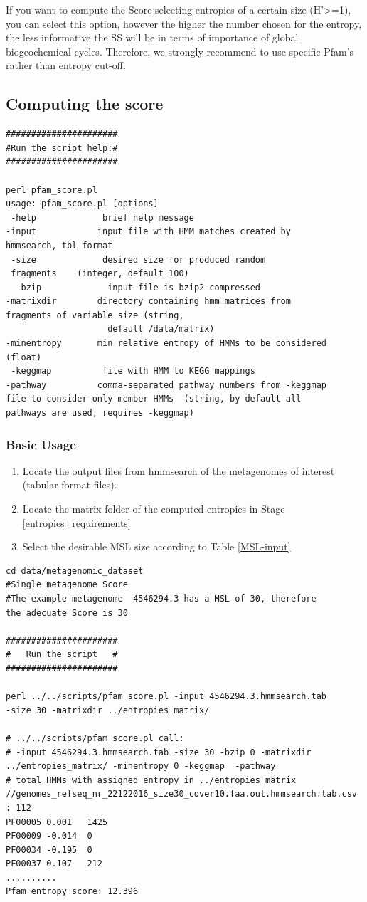 \documentclass[12pt]{report}
\begin{document}
If you want to compute the Score selecting entropies of a certain 
size (H'>=1), you can select this 
option, however  the higher the number chosen for the entropy,  
the less informative the SS will be in terms of importance of 
global biogeochemical cycles. Therefore, we strongly recommend to 
use specific Pfam's rather than entropy cut-off. 

\subsection{Computing the score}
\label{entropy_score}
\begin{verbatim}
######################
#Run the script help:#
######################

perl pfam_score.pl
usage: pfam_score.pl [options] 
 -help             brief help message
-input            input file with HMM matches created by 
hmmsearch, tbl format
 -size             desired size for produced random 
 fragments    (integer, default 100)
  -bzip             input file is bzip2-compressed
-matrixdir        directory containing hmm matrices from 
fragments of variable size (string, 
                    default /data/matrix)
-minentropy       min relative entropy of HMMs to be considered (float)
 -keggmap          file with HMM to KEGG mappings
-pathway          comma-separated pathway numbers from -keggmap 
file to consider only member HMMs  (string, by default all 
pathways are used, requires -keggmap)
\end{verbatim}
\subsubsection{Basic Usage }

\begin{enumerate}
\item Locate the output files from hmmsearch of the metagenomes of interest
(tabular format files). 
\item Locate the matrix folder of the computed entropies in Stage
\ref{entropies_requirements} 
\item Select the desirable MSL size according to Table \ref{MSL-input}
\end{enumerate}
\begin{verbatim}
cd data/metagenomic_dataset
#Single metagenome Score 
#The example metagenome  4546294.3 has a MSL of 30, therefore 
the adecuate Score is 30

######################
#   Run the script   #
######################

perl ../../scripts/pfam_score.pl -input 4546294.3.hmmsearch.tab 
-size 30 -matrixdir ../entropies_matrix/  

# ../../scripts/pfam_score.pl call:
# -input 4546294.3.hmmsearch.tab -size 30 -bzip 0 -matrixdir 
../entropies_matrix/ -minentropy 0 -keggmap  -pathway 
# total HMMs with assigned entropy in ../entropies_matrix
//genomes_refseq_nr_22122016_size30_cover10.faa.out.hmmsearch.tab.csv : 112
PF00005 0.001   1425
PF00009 -0.014  0
PF00034 -0.195  0
PF00037 0.107   212
..........
Pfam entropy score: 12.396
\end{verbatim}
\end{document}
